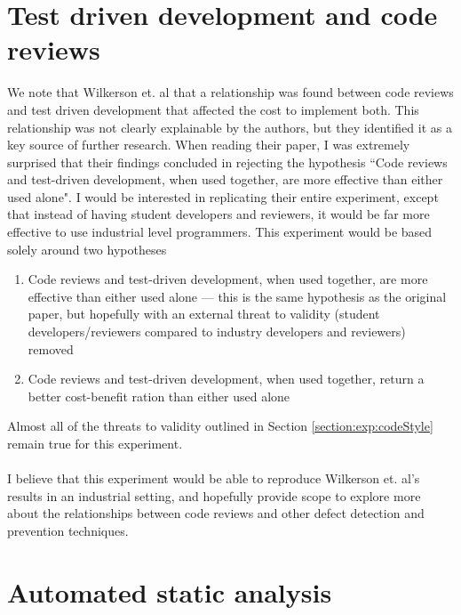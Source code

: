 \section{Test driven development and code reviews} \label{section:exp:TDD}

We note that Wilkerson et. al \cite{wilkerson2012comparing} that a relationship was found between
code reviews and test driven development that affected the cost to implement both.
This relationship was not clearly explainable by the authors, but they identified it as a key source
of further research.
When reading their paper, I was extremely surprised that their findings concluded in rejecting the
hypothesis ``Code reviews and test-driven development, when used together, are more effective than
either used alone".
I would be interested in replicating their entire experiment, except that instead of having student
developers and reviewers, it would be far more effective to use industrial level programmers.
This experiment would be based solely around two hypotheses
\begin{enumerate}
	\item Code reviews and test-driven development, when used together, are more effective than
either used alone --- this is the same hypothesis as the original paper, but hopefully with an
external threat to validity (student developers/reviewers compared to industry developers and
reviewers) removed
	\item Code reviews and test-driven development, when used together, return a better cost-benefit
		ration than either used alone
\end{enumerate}

Almost all of the threats to validity outlined in Section \ref{section:exp:codeStyle} remain true
for this experiment.\\
\\
I believe that this experiment would be able to reproduce Wilkerson et. al's results in an
industrial setting, and hopefully provide scope to explore more about the relationships between
code reviews and other defect detection and prevention techniques.

\section{Automated static analysis} \label{section:exp:staticAnal}

